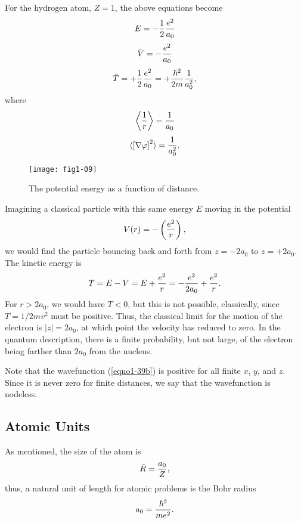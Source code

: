 For the hydrogen atom, $Z = 1$, the above equations become
\begin{equation}
E = - {1 \over 2} {e^2 \over a_0}
\end{equation}
\begin{equation}
{\bar V} = - {e^2 \over a_0}
\end{equation}
\begin{equation}
{\bar T} = + {1 \over 2} {e^2 \over a_0} = + {\hbar^2 \over 2m} {1 
\over a^2_0},
\end{equation}
where
\begin{equation}
\left\langle {1 \over r} \right\rangle = {1 \over a_0}
\end{equation}
\begin{equation}
\langle \left[ \nabla \varphi \right]^2 \rangle = {1 \over a^2_0}.
\end{equation}

\begin{figure}
\texttt{[image: fig1-09]}
\caption{The potential energy as a function of distance.}
\label{fig1-9}
\end{figure}

\noindent
Imagining a classical particle with this same energy $E$ moving in the
potential
\begin{equation}
V(r) = - \left( {e^2 \over r} \right),
\end{equation}
we would find the particle bouncing back and forth from $z = -2a_0$ 
to $z = + 2a_0$.  The kinetic energy is
\begin{equation}
T = E - V = E + {e^2 \over r} = - {e^2 \over 2a_0} + {e^2 \over r}.
\end{equation}
For $r > 2a_0$, we would have $T < 0$, but this is not possible,
classically, since $T = 1/2mv^2$ must be positive. Thus, the classical
limit for the motion of the electron is $|z| = 2a_0$, at which point
the velocity has reduced to zero. In the quantum description, there is
a finite probability, but not large, of the electron being farther
than $2a_0$ from the nucleus.

Note that the wavefunction (\ref{eqno1-39b}) is positive for all
finite $x$, $y$, and $z$.  Since it is never zero for finite
distances, we say that the wavefunction is nodeless.

\subsection{Atomic Units}

As mentioned, the size of the atom is
\begin{equation}
{\bar R} = {a_0 \over Z},
\end{equation}
thus, a natural unit of length for atomic problems is the Bohr radius
\begin{equation}
a_0 = {\hbar^2 \over me^2}.
\end{equation}

